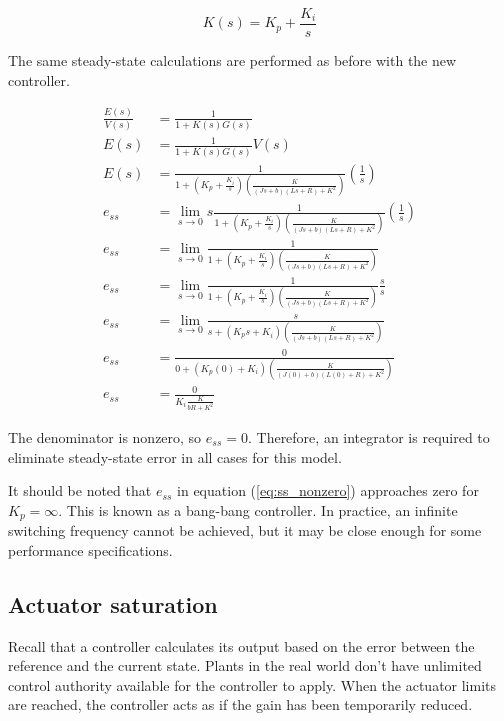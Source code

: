 \begin{equation*}
  K(s) = K_p + \frac{K_i}{s}
\end{equation*}

The same steady-state calculations are performed as before with the new
controller.

\begin{align*}
  \frac{E(s)}{V(s)} &= \frac{1}{1 + K(s)G(s)} \\
  E(s) &= \frac{1}{1 + K(s)G(s)} V(s) \\
  E(s) &= \frac{1}{1 + \left(K_p + \frac{K_i}{s}\right)
    \left(\frac{K}{(Js+b)(Ls+R)+K^2}\right)} \left(\frac{1}{s}\right) \\
  e_{ss} &= \lim_{s\to0} s \frac{1}{1 + \left(K_p + \frac{K_i}{s}\right)
    \left(\frac{K}{(Js+b)(Ls+R)+K^2}\right)} \left(\frac{1}{s}\right) \\
  e_{ss} &= \lim_{s\to0} \frac{1}{1 + \left(K_p + \frac{K_i}{s}\right)
    \left(\frac{K}{(Js+b)(Ls+R)+K^2}\right)} \\
  e_{ss} &= \lim_{s\to0} \frac{1}{1 + \left(K_p + \frac{K_i}{s}\right)
    \left(\frac{K}{(Js+b)(Ls+R)+K^2}\right)} \frac{s}{s} \\
  e_{ss} &= \lim_{s\to0} \frac{s}{s + \left(K_p s + K_i\right)
    \left(\frac{K}{(Js+b)(Ls+R)+K^2}\right)} \\
  e_{ss} &= \frac{0}{0 + (K_p (0) + K_i)
    \left(\frac{K}{(J(0)+b)(L(0)+R)+K^2}\right)} \\
  e_{ss} &= \frac{0}{K_i \frac{K}{bR+K^2}}
\end{align*}

The denominator is nonzero, so $e_{ss} = 0$. Therefore, an integrator is
required to eliminate \gls{steady-state error} in all cases for this
\gls{model}.

It should be noted that $e_{ss}$ in equation (\ref{eq:ss_nonzero}) approaches
zero for $K_p = \infty$. This is known as a bang-bang controller. In practice,
an infinite switching frequency cannot be achieved, but it may be close enough
for some performance specifications.

\subsection{Actuator saturation}

Recall that a controller calculates its output based on the error between the
reference and the current state. Plants in the real world don't have unlimited
control authority available for the controller to apply. When the actuator
limits are reached, the controller acts as if the gain has been temporarily
reduced.

